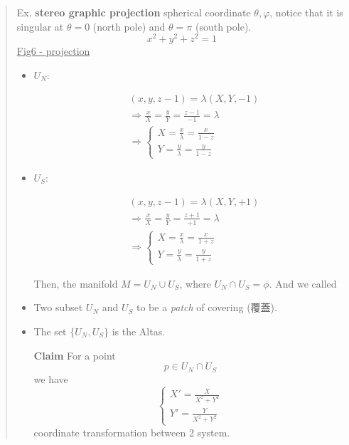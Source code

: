 \begin{quote}
	Ex. \textbf{stereo graphic projection}
spherical coordinate $\theta,\varphi$, notice that it is singular at $\theta = 0$ (north pole) and $\theta = \pi$ (south pole).
\begin{equation}
x^2+y^2+z^2=1
\end{equation}
\underline{Fig6 - projection}
\begin{itemize}
	\item $U_N$:

\begin{equation}
\begin{aligned}
&(x,y,z-1) = \lambda (X,Y,-1)\\
&\Rightarrow \frac{x}{X} = \frac{y}{Y} = \frac{z-1}{-1} = \lambda\\
&\Rightarrow \begin{cases}
\displaystyle X= \frac{x}{\lambda} = \frac{x}{1-z}\\
\displaystyle Y= \frac{y}{\lambda} = \frac{y}{1-z}
\end{cases}
\end{aligned}
\end{equation}

	\item $U_S$:

\begin{equation}
\begin{aligned}
&(x,y,z-1) = \lambda (X,Y,+1)\\
&\Rightarrow \frac{x}{X} = \frac{y}{Y} = \frac{z+1}{+1} = \lambda\\
&\Rightarrow \begin{cases}
\displaystyle X= \frac{x}{\lambda} = \frac{x}{1+z}\\
\displaystyle Y= \frac{y}{\lambda} = \frac{y}{1+z}
\end{cases}
\end{aligned}
\end{equation}

Then, the manifold $M = U_{N}\cup U_{S}$, where $U_{N}\cap U_{S}=\phi$. And we called
	\item Two subset $U_N$ and $U_S$ to be a \textit{patch} of covering (覆蓋).
	\item The set $\{U_N,U_S\}$ is the Altas.



\textbf{Claim}
For a point
\begin{equation}
p\in U_{N}\cap U_S
\end{equation}
we have
\begin{equation}
\begin{cases}
\displaystyle X' = \frac{X}{X^2+Y^2}\\
\displaystyle Y' = \frac{Y}{X^2+Y^2}
\end{cases}
\end{equation}
coordinate transformation between 2 system.
\end{itemize}

\end{quote}


